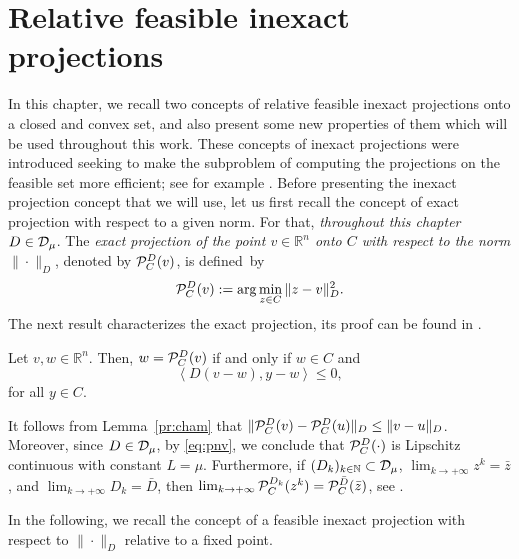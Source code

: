 \chapter{Relative feasible inexact projections} \label{chap:SubInexProj}


In this chapter, we recall two concepts  of relative feasible inexact projections onto a closed and convex set, and  also  present  some  new properties of them which will be used throughout this work. These  concepts  of inexact projections were    introduced seeking to make the subproblem of computing the projections on the feasible  set more efficient;  see for example \cite{BirginMartinezRaydan2003,SalzoVilla2012,VillaSalzo2013}. Before presenting the  inexact projection concept that we will use, let us first recall the concept of exact projection with respect to a given  norm.  For that, {\it throughout this chapter  $D\in {\cal D}_{\mu}$}. The {\it exact  projection of the point $v\in \mathbb{R}^{n}$ onto $C$ with respect to the norm $\| \cdot \| _{D}$}, denoted by  ${\cal P}_{C}^{D}(v)$, is  defined~by
\begin{equation}\label{eq:exactM}
	{\cal P}_{C}^{D}(v):=\arg \min _{z\in C}\|z-v\|^2_{D}.
\end{equation}
The next result  characterizes  the exact projection, its  proof can be found in  \cite[Theorem 3.14]{BauschkeLivro2014}.

\begin{lemma} \label{pr:cham}
	Let $v, w \in {\mathbb R}^n$.  Then,  $w={\cal P}_{C}^{D}(v)$ if and only if  $w\in C$ and  
	$$\left\langle D(v-w), y-w\right\rangle \leq  0,$$   
	for all $y \in C.$
\end{lemma}

\begin{remark} \label{re:cproj}
	It follows from Lemma~\ref{pr:cham}  that $\|{\cal P}_{C}^{D}(v)-{\cal P}_{C}^{D}(u)\|_{D}\leq \|v-u\|_{D}$.  Moreover, since   $D\in {\cal D}_{\mu}$, by \eqref{eq:pnv}, we conclude that   ${\cal P}_{C}^{D}(\cdot)$ is Lipschitz continuous with constant $L=\mu$.   Furthermore,  if  $(D_k)_{k\in\mathbb{N}}\subset {\cal D}_{\mu}$,    $\lim_{k\to +\infty} z^{k} = \bar{z}$, and   $\lim_{k \to +\infty} D_{k} = \bar{D}$, then $\lim_{k \to +\infty}{\cal P}_{C}^{D_k}(z^{k})= {\cal P}_{C}^{\bar D}(\bar{z})$, see   \cite[Proposition~4.2]{CombettesVu2013}.
\end{remark}

In the following, we recall  the  concept of a  feasible inexact projection with respect to $\| \cdot \| _{D}$ relative to a fixed point. 

